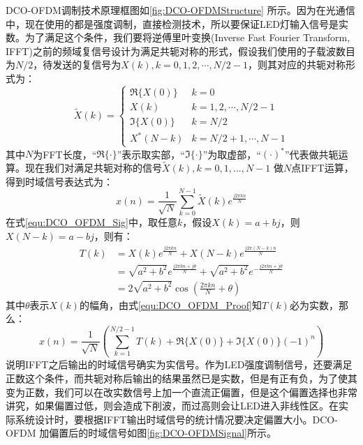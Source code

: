 DCO-OFDM调制技术原理框图如\autoref{fig:DCO-OFDMStructure} 所示。因为在光通信中，现在使用的都是强度调制，直接检测技术，所以要保证LED灯输入信号是实数。为了满足这个条件，我们要将逆傅里叶变换(Inverse Fast Fourier Transform, IFFT)之前的频域复信号设计为满足共轭对称的形式\cite{proakisdigital}，假设我们使用的子载波数目为$N/2$，待发送的复信号为$X(k),k = 0, 1, 2, \cdots, N/2-1$，则其对应的共轭对称形式为：
\begin{equation}
    \tilde{X}(k) =
    \begin{cases}
        \Re\{X(0)\}  & k = 0 \\
        X(k) & k = 1, 2, \cdots, N/2-1 \\
        \Im\{X(0)\} & k = N/2 \\
        X^*(N-k) & k = N/2+1, \cdots, N-1
    \end{cases}
    \label{equ:HermitianSymmetry}
\end{equation}
其中$N$为FFT长度，“$\Re\{\cdot\}$”表示取实部，“$\Im\{\cdot\}$”为取虚部，“$(\cdot)^*$”代表做共轭运算。现在我们对满足共轭对称的信号$\tilde{X}(k),k=0,1,...,N-1$ 做$N$点IFFT运算，得到时域信号表达式为：
\begin{equation}
    x(n) = \frac{1}{\sqrt{N}}\sum \limits_{k=0}^{N-1}\tilde{X}(k)e^{\frac{j2\pi kn}{N}}
    \label{equ:DCO_OFDM_Sig}
\end{equation}
在式\ref{equ:DCO_OFDM_Sig}中，取任意$k$，假设$X(k)=a+bj$，则$X(N-k)=a-bj$，则有：
\begin{align}
    T(k) &= X(k)e^{\frac{j2\pi kn}{N}}+X(N-k)e^{\frac{j2\pi (N-k)n}{N}}\nonumber  \\
    &=\sqrt{a^2+b^2}e^{\frac{j2\pi kn+j\theta}{N}}+\sqrt{a^2+b^2}e^{-\frac{j2\pi kn+j\theta}{N}}\nonumber \\
    &=2\sqrt{a^2+b^2}\cos(\frac{2\pi kn}{N}+\theta)
    \label{equ:DCO_OFDM_Proof}
\end{align}
其中$\theta$表示$X(k)$的幅角，由式\ref{equ:DCO_OFDM_Proof}知$T(k)$必为实数，那么：
\begin{equation}
    x(n)=\frac{1}{\sqrt{N}}(\sum \limits_{k=1}^{N/2-1}T(k)+ \Re\{X(0)\} +\Im\{X(0)\}(-1)^n)
\end{equation}
说明IFFT之后输出的时域信号确实为实信号。作为LED强度调制信号，还要满足正数这个条件，而共轭对称后输出的结果虽然已是实数，但是有正有负，为了使其变为正数，我们可以在改实数信号上加一个直流正偏置，但是这个偏置选择也非常讲究，如果偏置过低，则会造成下削波，而过高则会让LED进入非线性区。在实际系统设计时，要根据IFFT输出时域信号的统计情况要决定偏置大小。DCO-OFDM 加偏置后的时域信号如图\autoref{fig:DCO-OFDMSignal}所示。

